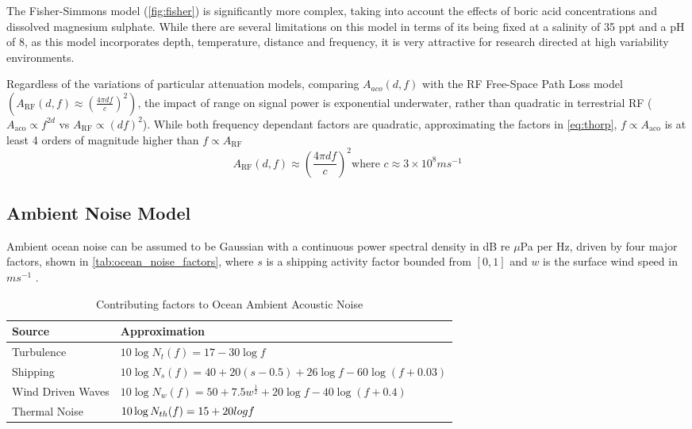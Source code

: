%
The Fisher-Simmons model (\autoref{fig:fisher}) is significantly more complex, taking into account the effects of boric acid concentrations and dissolved magnesium sulphate. While there are several limitations on this model in terms of its being fixed at a salinity of 35 ppt and a pH of 8, as this model incorporates depth, temperature, distance and frequency, it is very attractive for research directed at high variability environments.




Regardless of the variations of particular attenuation models, comparing $A_{aco}(d,f)$ with the RF Free-Space Path Loss model $(A_{\text{RF}}(d,f) \approx \left( \frac{4\pi d f}{c} \right)^2)$, the impact of range on signal power is exponential underwater, rather than quadratic in terrestrial RF ($A_{\text{aco}} \propto f^{2d}$ vs $A_{\text{RF}} \propto (df)^2$). 
While both frequency dependant factors are quadratic, approximating the factors in \eqref{eq:thorp}, $f\propto A_{\text{aco}}$ is at least 4 orders of magnitude higher than $f\propto A_{\text{RF}}$
\begin{equation}
  \label{eq:fspl}
  A_{\text{RF}}(d,f) \approx \left( \frac{4\pi d f}{c} \right)^2
  \text{where }c\approx 3\times10^8ms^{-1}
\end{equation}


 \subsection{Ambient Noise Model}

 Ambient ocean noise can be assumed to be Gaussian with a continuous power spectral density in dB re $\mu$Pa per Hz, driven by four major factors, shown in \autoref{tab:ocean_noise_factors}, where $s$ is a shipping activity factor bounded from $[0,1]$ and $w$ is the surface wind speed in $ms^{-1}$ \cite{coates1989}.

\begin{table}[h]\centering
  \caption{Contributing factors to Ocean Ambient Acoustic Noise}
  \label{tab:ocean_noise_factors}
  \begin{tabularx}{\textwidth}{p{3.5cm} X}\toprule
    Source & Approximation \\ \midrule
    Turbulence & $10 \log N_t(f)=17-30\log f$\\
    Shipping & $10 \log N_s(f) = 40+20(s-0.5)+26\log f-60\log(f+0.03)$\\
    Wind Driven Waves & $10\log N_w(f) = 50+7.5w^{\frac{1}{2}}+20\log f - 40\log(f+0.4)$\\ 
    Thermal Noise & $10\log N_{th}(f) = \-15 + 20 log f$\\\bottomrule
  \end{tabularx}
\end{table}

